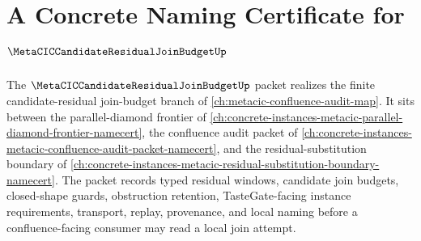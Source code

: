 \chapter{A Concrete Naming Certificate for $\MetaCICCandidateResidualJoinBudgetUp$}
\label{ch:concrete-instances-metacic-candidate-residual-join-budget-namecert}

The $\MetaCICCandidateResidualJoinBudgetUp$ packet realizes the finite candidate-residual join-budget branch of \autoref{ch:metacic-confluence-audit-map}. It sits between the parallel-diamond frontier of \autoref{ch:concrete-instances-metacic-parallel-diamond-frontier-namecert}, the confluence audit packet of \autoref{ch:concrete-instances-metacic-confluence-audit-packet-namecert}, and the residual-substitution boundary of \autoref{ch:concrete-instances-metacic-residual-substitution-boundary-namecert}. The packet records typed residual windows, candidate join budgets, closed-shape guards, obstruction retention, TasteGate-facing instance requirements, transport, replay, provenance, and local naming before a confluence-facing consumer may read a local join attempt.

